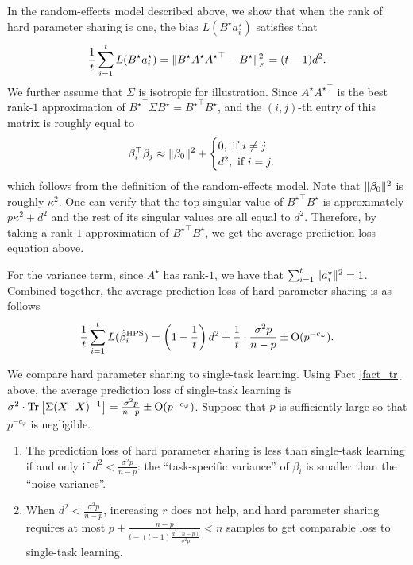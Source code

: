 \begin{example}\label{ex_same_cov}
In the random-effects model described above, we show that when the rank of hard parameter sharing is one, the bias $L(B^{\star} a_i^{\star})$ satisfies that
\[ \frac{1}{t} \sum_{i=1}^t L(B^{\star} a_i^{\star}) = \|B^{\star} A^{\star} {A^{\star}}^{\top} - B^{\star}\|_{_{F}}^2 = (t - 1) d^2. \]
We further assume that $\Sigma$ is isotropic for illustration.
Since $A^{\star} {A^{\star}}^{\top}$ is the best rank-$1$ approximation of ${B^{\star}}^{\top}\Sigma B^{\star} = {B^{\star}}^{\top} B^{\star}$, and the $(i, j)$-th entry of this matrix is roughly equal to
\begin{align*}
	\beta_i^{\top} \beta_j \approx \|\beta_0\|^2 + \begin{cases}
																								0, \text{ if } i \neq j \\
																								d^2, \text{ if } i = j.
	\end{cases}
\end{align*}
which follows from the definition of the random-effects model.
Note that $\|\beta_0\|^2$ is roughly $\kappa^2$.
One can verify that the top singular value of ${B^{\star}}^{\top} B^{\star}$ is approximately $p \kappa^2 + d^2$ and the rest of its singular values are all equal to $d^2$.
Therefore, by taking a rank-$1$ approximation of ${B^{\star}}^{\top} B^{\star}$, we get the average prediction loss equation above.

For the variance term, since $A^{\star}$ has rank-$1$, we have that $\sum_{i=1}^t \|a_i^{\star}\|^2 = 1$.
Combined together, the average prediction loss of hard parameter sharing is as follows
\[ \frac{1}{t}\sum_{i=1}^t L(\hat{\beta}_i^{\textup{HPS}}) = \left({1 - \frac{1}{t}}\right) d^2 + \frac{1}{t} \cdot \frac{\sigma^2 p}{n - p} \pm \operatorname{O}(p^{-c_{\varphi}}). \]
\end{example}
We compare hard parameter sharing to single-task learning.
Using Fact \ref{fact_tr} above, the average prediction loss of single-task learning is $\sigma^2\cdot \operatorname{Tr}\left[\Sigma (X^{\top} X)^{-1}\right] = \frac{\sigma^2 p}{n - p} \pm \operatorname{O}(p^{-{c_{\varphi}}})$.
	Suppose that $p$ is sufficiently large so that $p^{-c_{\varphi}}$ is negligible.
\begin{enumerate}
	\item The prediction loss of hard parameter sharing is less than single-task learning if and only if $d^2 < \frac{\sigma^2 p}{n - p}$: the ``task-specific variance'' of $\beta_i$ is smaller than the ``noise variance''.
	\item When $d^2 < \frac{\sigma^2 p}{n - p}$, increasing $r$ does not help, and hard parameter sharing requires at most $p + \frac{n - p}{t - (t - 1)\frac{d^2 (n - p)}{\sigma^2 p}} < n$ samples to get comparable loss to single-task learning.
\end{enumerate}


